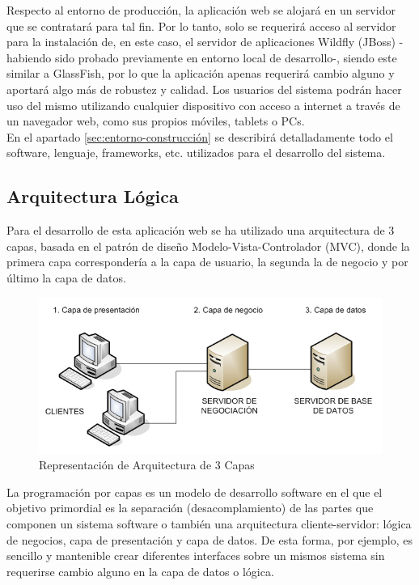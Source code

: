 Respecto al entorno de producción, la aplicación web se alojará en un servidor que se contratará para tal fin. Por lo tanto, solo se requerirá acceso al servidor para la instalación de, en este caso, el servidor de aplicaciones Wildfly (JBoss) -habiendo sido probado previamente en entorno local de desarrollo-, siendo este similar a GlassFish, por lo que la aplicación apenas requerirá cambio alguno y aportará algo más de robustez y calidad. Los usuarios del sistema podrán hacer uso del mismo utilizando cualquier dispositivo con acceso a internet a través de un navegador web, como sus propios móviles, tablets o PCs. \\

En el apartado \ref{sec:entorno-construcción} se describirá detalladamente todo el software, lenguaje, frameworks, etc. utilizados para el desarrollo del sistema.


\subsection{Arquitectura Lógica} \label{sec:arquitectura-logica}

Para el desarrollo de esta aplicación web se ha utilizado una arquitectura de 3 capas, basada en el patrón de diseño Modelo-Vista-Controlador (MVC), donde la primera capa correspondería a la capa de usuario, la segunda la de negocio y por último la capa de datos.

\vspace{10mm}

\begin{figure}[H]
\centering
  \includegraphics[scale=.55]{img/arquitectura-tres-capas.jpg}
  \caption{Representación de Arquitectura de 3 Capas}
  \label{fig:arquitectura-tres-capas}
\end{figure}

\vspace{10mm}

La programación por capas es un modelo de desarrollo software en el que el objetivo primordial es la separación (desacomplamiento) de las partes que componen un sistema software o también una arquitectura cliente-servidor: lógica de negocios, capa de presentación y capa de datos. De esta forma, por ejemplo, es sencillo y mantenible crear diferentes interfaces sobre un mismos sistema sin requerirse cambio alguno en la capa de datos o lógica.\\

